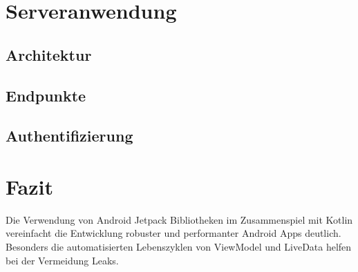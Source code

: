 \documentclass[a4paper, 11pt]{article}
\begin{document}
\section{Serveranwendung}
\label{sec:backend}

\subsection{Architektur}
\label{subsec:backend:architecture}

\subsection{Endpunkte}
\label{subsec:backend:endpoints}

\subsection{Authentifizierung}
\label{subsec:backend:authentication}

\section{Fazit}
\label{sec:conclusion}

Die Verwendung von Android Jetpack Bibliotheken im Zusammenspiel mit Kotlin vereinfacht die Entwicklung robuster und performanter Android Apps deutlich.
Besonders die automatisierten Lebenszyklen von ViewModel und LiveData helfen bei der Vermeidung Leaks.
\end{document}
